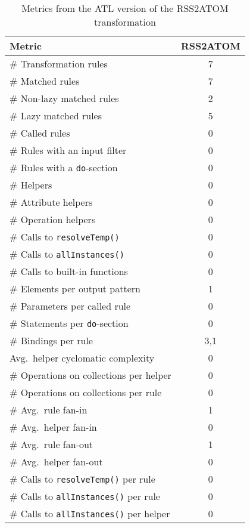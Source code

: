\begin{table}[htb]
\centering\small
\begin{tabular}{|l|c|}
\hline
Metric & RSS2ATOM \\
\hline
\# Transformation rules & 7 \\
\hline
\# Matched rules & 7  \\
\hline
\# Non-lazy matched rules & 2 \\
\hline
\# Lazy matched rules & 5 \\
\hline
\# Called rules & 0 \\
\hline
\# Rules with an input filter & 0 \\
\hline
\# Rules with a \texttt{do}-section & 0 \\
\hline
\# Helpers & 0 \\
\hline
\# Attribute helpers & 0 \\
\hline
\# Operation helpers & 0 \\
\hline
\# Calls to \texttt{resolveTemp()} & 0 \\
\hline
\# Calls to \texttt{allInstances()} & 0 \\
\hline
\# Calls to built-in functions & 0 \\
\hline
\# Elements per output pattern & 1 \\
\hline
\# Parameters per called rule & 0 \\
\hline
\# Statements per \texttt{do}-section & 0 \\
\hline
\# Bindings per rule & 3,1 \\
\hline
Avg.\ helper cyclomatic complexity & 0 \\
\hline
\# Operations on collections per helper & 0 \\
\hline
\# Operations on collections per rule & 0 \\
\hline
\# Avg.\ rule fan-in & 1 \\
\hline
\# Avg.\ helper fan-in & 0 \\
\hline
\# Avg.\ rule fan-out & 1 \\
\hline
\# Avg.\ helper fan-out & 0 \\
\hline
\# Calls to \texttt{resolveTemp()} per rule & 0 \\
\hline
\# Calls to \texttt{allInstances()} per rule & 0 \\
\hline
\# Calls to \texttt{allInstances()} per helper & 0 \\
\hline
\end{tabular}
\normalsize
\caption{Metrics from the ATL version of the RSS2ATOM transformation}
\label{tab:metrics:ATL:R2A}
\end{table} 
